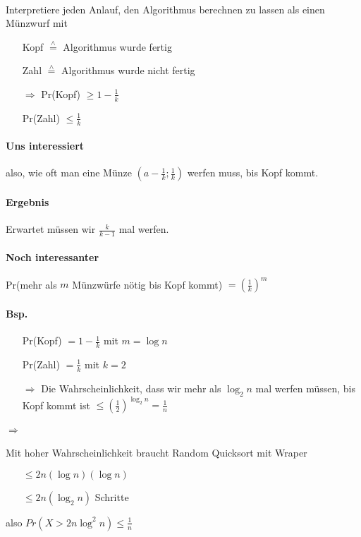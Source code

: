 \paragraph*{} Interpretiere jeden Anlauf, den Algorithmus berechnen zu lassen als einen Münzwurf mit
\begin{itemize}
	\item[] Kopf $\overset{\wedge}{=}$ Algorithmus wurde fertig
	\item[] Zahl $\overset{\wedge}{=}$ Algorithmus wurde nicht fertig
	\item[$\Rightarrow$] Pr(Kopf) $\geq 1 - \frac{1}{k}$
	\item[] Pr(Zahl) $\leq \frac{1}{k}$
\end{itemize}

\paragraph*{Uns interessiert} also, wie oft man eine Münze $(a-\frac{1}{k};\frac{1}{k})$ werfen muss, bis Kopf kommt.

\paragraph*{Ergebnis} Erwartet müssen wir $\frac{k}{k-1}$ mal werfen.

\paragraph*{Noch interessanter} Pr(mehr als $m$ Münzwürfe nötig bis Kopf kommt) $= (\frac{1}{k})^m$

\paragraph*{Bsp.}
\begin{itemize}
	\item[] Pr(Kopf) $= 1 - \frac{1}{k}$ mit $m = \log n$ %
	\item[] Pr(Zahl) $= \frac{1}{k}$ mit $k=2$
	\item[$\Rightarrow$] Die Wahrscheinlichkeit, dass wir mehr als $\log_2 n$ mal werfen müssen, bis Kopf kommt ist $\leq (\frac{1}{2})^{\log_2 n} = \frac{1}{n}$
\end{itemize}

\paragraph*{$\Rightarrow$} Mit hoher Wahrscheinlichkeit braucht Random Quicksort mit Wraper
\begin{itemize}
	\item[] $\leq 2n (\log n)(\log n)$
	\item[] $\leq 2n (\log_2 n)$ Schritte
\end{itemize}
also $Pr(X > 2n \log^2 n)  \leq \frac{1}{n}$

